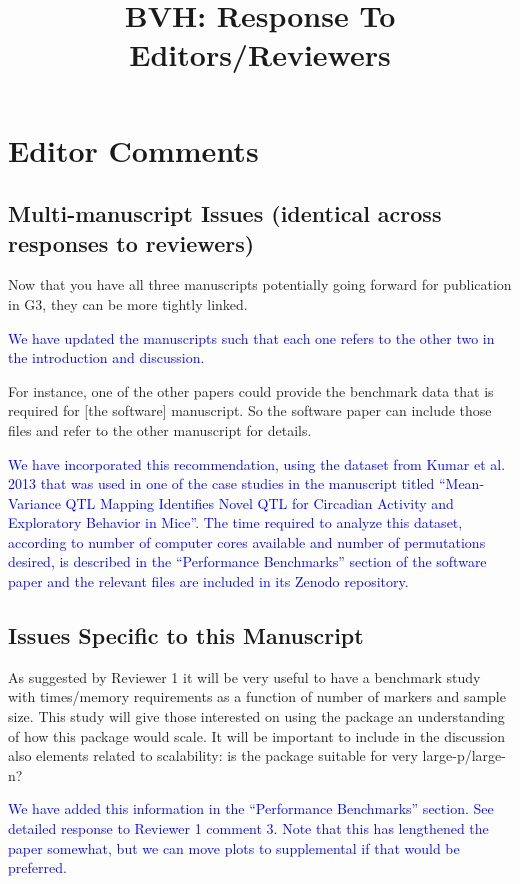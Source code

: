 \documentclass[11pt]{article}
\title{BVH: Response To Editors/Reviewers}
\newcommand{\EditorQuestion}[1]{
  \vspace{5pt}\goodbreak
  \noindent\fbox{Editor:} #1
  \normalfont\par
}
\newcommand{\Response}[1]{
  \goodbreak
  \textcolor{blue}{#1}
  \normalfont\par
}
\begin{document}
\reversemarginpar

\section*{Editor Comments}

\subsection*{Multi-manuscript Issues (identical across responses to reviewers)}

\EditorQuestion{
  Now that you have all three manuscripts potentially going forward for publication in G3, they can be more tightly linked.
}
\Response{
  We have updated the manuscripts such that each one refers to the other two in the introduction and discussion.
}

\EditorQuestion{
   For instance, one of the other papers could provide the benchmark data that is required for [the software] manuscript.
   So the software paper can include those files and refer to the other manuscript for details.
}
\Response{
  We have incorporated this recommendation, using the dataset from Kumar et al. 2013 that was used in one of the case studies in the manuscript titled ``Mean-Variance QTL Mapping Identifies Novel QTL for Circadian Activity and Exploratory Behavior in Mice''.
  The time required to analyze this dataset, according to number of computer cores available and number of permutations desired, is described in the ``Performance Benchmarks'' section of the software paper and the relevant files are included in its Zenodo repository.
}



\subsection*{Issues Specific to this Manuscript}

\EditorQuestion{
  As suggested by Reviewer 1 it will be very useful to have a benchmark study with times/memory requirements as a function of number of markers and sample size.
  This study will give those interested on using the package an understanding of how this package would scale.
  It will be important to include in the discussion also elements related to scalability: is the package suitable for very large-p/large-n? 
}
\Response{
  We have added this information in the ``Performance Benchmarks'' section. 
  See detailed response to Reviewer 1 comment 3. 
  Note that this has lengthened the paper somewhat, but we can move plots to supplemental if that would be preferred.
}
\end{document}
